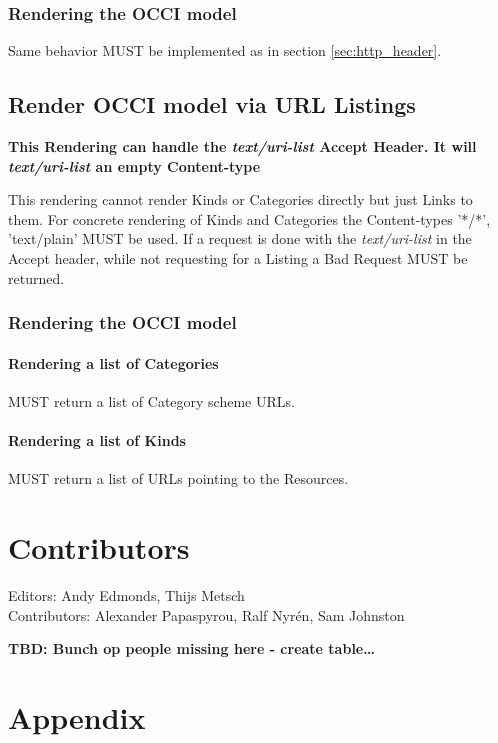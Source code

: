 \documentclass[10pt,a4paper]{article}
\begin{document}
\subsubsection{Rendering the OCCI model}

Same behavior MUST be implemented as in section \ref{sec:http_header}.

\subsection{Render OCCI model via URL Listings}

\textbf{This Rendering can handle the \textit{text/uri-list} Accept Header. It will \textit{text/uri-list} an empty Content-type}

This rendering cannot render Kinds or Categories directly but just Links to them. For concrete rendering of Kinds and Categories the Content-types '*/*', 'text/plain' MUST be used. If a request is done with the \textit{text/uri-list} in the Accept header, while not requesting for a Listing a Bad Request MUST be returned.

\subsubsection{Rendering the OCCI model}

\paragraph{Rendering a list of Categories}

MUST return a list of Category scheme URLs.

\paragraph{Rendering a list of Kinds}

MUST return a list of URLs pointing to the Resources.

\section{Contributors}

Editors: Andy Edmonds, Thijs Metsch \\
Contributors: Alexander Papaspyrou, Ralf Nyrén, Sam Johnston

\textbf{TBD: Bunch op people missing here - create table\ldots}

\section{Appendix}
\end{document}
